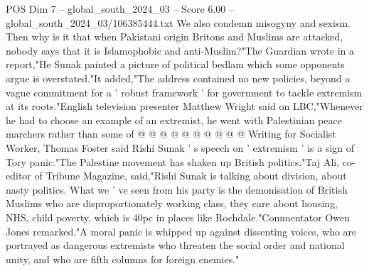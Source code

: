 \begin{textsample}{POS Dim 7 – global\_south\_2024\_03 – Score 6.00 – global\_south\_2024\_03/106385444.txt}
We also condemn misogyny and sexism.
Then why is it that when Pakistani origin Britons and Muslims are attacked, nobody says that it is Islamophobic and anti-Muslim?"The Guardian wrote in a report,"He Sunak painted a picture of political bedlam which some opponents argue is overstated."It added,"The address contained no new policies, beyond a vague commitment for a ' robust framework ' for government to tackle extremism at its roots."English television presenter Matthew Wright said on LBC,"Whenever he had to choose an example of an extremist, he went with Palestinian peace marchers rather than some of @ @ @ @ @ @ @ @ @ @ Writing for Socialist Worker, Thomas Foster said Rishi Sunak ' s speech on ' extremism ' is a sign of Tory panic."The Palestine movement has shaken up British politics."Taj Ali, co-editor of Tribune Magazine, said,"Rishi Sunak is talking about division, about nasty politics.
What we ' ve seen from his party is the demonisation of British Muslims who are disproportionately working class, they care about housing, NHS, child poverty, which is 40pc in places like Rochdale."Commentator Owen Jones remarked,"A moral panic is whipped up against dissenting voices, who are portrayed as dangerous extremists who threaten the social order and national unity, and who are fifth columns for foreign enemies."

\end{textsample}
